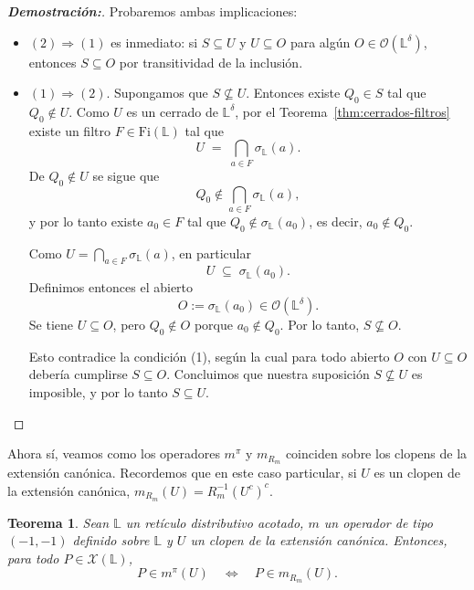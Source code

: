 \documentclass[12pt]{book}
\newtheorem{theorem}{Teorema}[section]
\begin{document}
\begin{proof}[\textbf{Demostración:}]
Probaremos ambas implicaciones:
\begin{itemize}
\item  $(2)\Rightarrow(1)$ es inmediato: si $S\subseteq U$ y $U\subseteq O$ para algún
$O\in\mathcal{O}(\mathbb{L}^\delta)$, entonces $S\subseteq O$ por transitividad de la inclusión.

\item $(1)\Rightarrow(2)$.
Supongamos que $S\not\subseteq U$. Entonces existe $Q_{0}\in S$ tal que $Q_{0}\notin U$.
Como $U$ es un cerrado de $\mathbb{L}^\delta$, por el Teorema~\ref{thm:cerrados-filtros}
existe un filtro $F\in\mathrm{Fi}(\mathbb{L})$ tal que
\[
U \;=\; \bigcap_{a\in F}\sigma_{\mathbb{L}}(a).
\]
De $Q_{0}\notin U$ se sigue que
\[
Q_{0}\notin\bigcap_{a\in F}\sigma_{\mathbb{L}}(a),
\]
y por lo tanto existe $a_{0}\in F$ tal que $Q_{0}\notin\sigma_{\mathbb{L}}(a_{0})$,
es decir, $a_{0}\notin Q_{0}$.

Como $U=\bigcap_{a\in F}\sigma_{\mathbb{L}}(a)$, en particular
\[
U\;\subseteq\;\sigma_{\mathbb{L}}(a_{0}).
\]
Definimos entonces el abierto
\[
O:=\sigma_{\mathbb{L}}(a_{0})\in\mathcal{O}(\mathbb{L}^\delta).
\]
Se tiene $U\subseteq O$, pero $Q_{0}\notin O$ porque $a_{0}\notin Q_{0}$.
Por lo tanto, $S\nsubseteq O$.

Esto contradice la condición (1), según la cual para todo abierto $O$ con $U\subseteq O$
debería cumplirse $S\subseteq O$. Concluimos que nuestra suposición $S\not\subseteq U$
es imposible, y por lo tanto $S\subseteq U$.
\end{itemize}
\end{proof}


Ahora sí, veamos como los operadores \(m^\pi\) y \(m_{R_m}\) coinciden sobre los clopens de la extensión canónica. Recordemos que en este caso particular, si $U$ es un clopen de la extensión canónica, $m_{R_m}(U)=R_m^{-1}(U^c)^c$.
\begin{theorem} \label{teo:igualdad-operadores-1-1}
Sean $\mathbb{L}$ un retículo distributivo acotado, $m$ un operador de tipo $(-1,-1)$ definido sobre $\mathbb{L}$ y $U$ un clopen de la extensión canónica. Entonces, para todo
$P\in\mathcal X(\mathbb L)$,
\[
P\in m^\pi(U)
\quad\Longleftrightarrow\quad
P\in m_{R_m}(U).
\]
\end{theorem}
\end{document}
